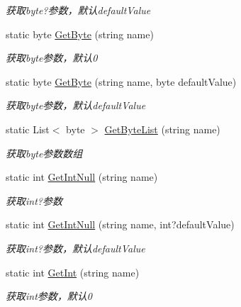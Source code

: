 \begin{DoxyCompactItemize}
\begin{DoxyCompactList}\small\item\em 获取byte?参数，默认default\+Value \end{DoxyCompactList}\item 
static byte \hyperlink{class_x_c_l_net_tools_1_1_string_hander_1_1_form_helper_aac299eb0719beba6c618deeed497fd76}{Get\+Byte} (string name)
\begin{DoxyCompactList}\small\item\em 获取byte参数，默认0 \end{DoxyCompactList}\item 
static byte \hyperlink{class_x_c_l_net_tools_1_1_string_hander_1_1_form_helper_aa1090c02b273fe23de21755a7b574a08}{Get\+Byte} (string name, byte default\+Value)
\begin{DoxyCompactList}\small\item\em 获取byte参数，默认default\+Value \end{DoxyCompactList}\item 
static List$<$ byte $>$ \hyperlink{class_x_c_l_net_tools_1_1_string_hander_1_1_form_helper_a575a372579f530e8fa7bce9a7808cf7f}{Get\+Byte\+List} (string name)
\begin{DoxyCompactList}\small\item\em 获取byte参数数组 \end{DoxyCompactList}\item 
static int \hyperlink{class_x_c_l_net_tools_1_1_string_hander_1_1_form_helper_a5f6d473bbc50e60cbd6c5015c1d4b010}{Get\+Int\+Null} (string name)
\begin{DoxyCompactList}\small\item\em 获取int?参数 \end{DoxyCompactList}\item 
static int \hyperlink{class_x_c_l_net_tools_1_1_string_hander_1_1_form_helper_a91af563c9654d78b004215b0d8cc5338}{Get\+Int\+Null} (string name, int?default\+Value)
\begin{DoxyCompactList}\small\item\em 获取int?参数，默认default\+Value \end{DoxyCompactList}\item 
static int \hyperlink{class_x_c_l_net_tools_1_1_string_hander_1_1_form_helper_ad3bcc9178dfa1bdc2d0e459b95d56fb4}{Get\+Int} (string name)
\begin{DoxyCompactList}\small\item\em 获取int参数，默认0 \end{DoxyCompactList}\item 

\end{DoxyCompactItemize}
